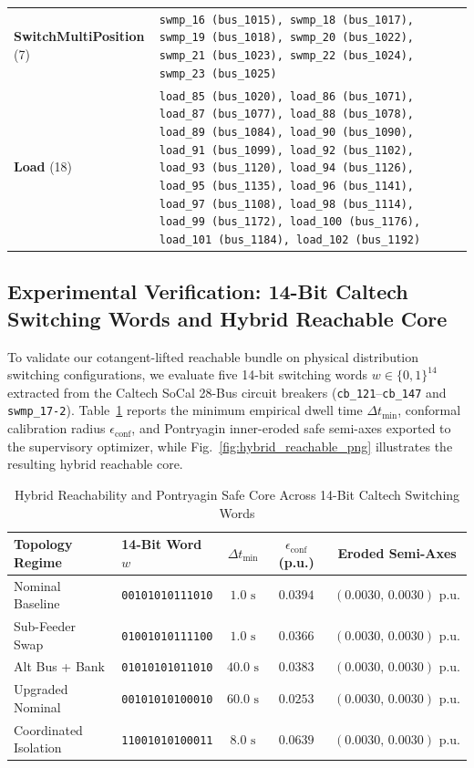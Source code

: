 \documentclass[journal]{IEEEtran}
\begin{document}
\begin{table}[!t]
\begin{tabularx}{\columnwidth}{@{}lX@{}}
\textbf{SwitchMultiPosition} (7) & \texttt{swmp\_16 (bus\_1015), swmp\_18 (bus\_1017), swmp\_19 (bus\_1018), swmp\_20 (bus\_1022), swmp\_21 (bus\_1023), swmp\_22 (bus\_1024), swmp\_23 (bus\_1025)} \\
\textbf{Load} (18) & \texttt{load\_85 (bus\_1020), load\_86 (bus\_1071), load\_87 (bus\_1077), load\_88 (bus\_1078), load\_89 (bus\_1084), load\_90 (bus\_1090), load\_91 (bus\_1099), load\_92 (bus\_1102), load\_93 (bus\_1120), load\_94 (bus\_1126), load\_95 (bus\_1135), load\_96 (bus\_1141), load\_97 (bus\_1108), load\_98 (bus\_1114), load\_99 (bus\_1172), load\_100 (bus\_1176), load\_101 (bus\_1184), load\_102 (bus\_1192)} \\
\bottomrule
\end{tabularx}
\end{table}
\subsection{Experimental Verification: 14-Bit Caltech Switching Words and Hybrid Reachable Core}
To validate our cotangent-lifted reachable bundle on physical distribution switching configurations, we evaluate five 14-bit switching words $w \in \{0, 1\}^{14}$ extracted from the Caltech SoCal 28-Bus circuit breakers (\texttt{cb\_121}--\texttt{cb\_147} and \texttt{swmp\_17-2}). Table~\ref{tab:caltech_14bit_words} reports the minimum empirical dwell time $\Delta t_{\min}$, conformal calibration radius $\epsilon_{\text{conf}}$, and Pontryagin inner-eroded safe semi-axes exported to the supervisory optimizer, while Fig.~\ref{fig:hybrid_reachable_png} illustrates the resulting hybrid reachable core.

\begin{table}[!t]
\centering
\caption{Hybrid Reachability and Pontryagin Safe Core Across 14-Bit Caltech Switching Words}
\label{tab:caltech_14bit_words}
\scriptsize
\setlength{\tabcolsep}{3.0pt}
\renewcommand{\arraystretch}{1.15}
\begin{tabular}{@{}llccc@{}}
\toprule
\textbf{Topology Regime} & \textbf{14-Bit Word $w$} & $\Delta t_{\min}$ & $\epsilon_{\text{conf}}$ (p.u.) & \textbf{Eroded Semi-Axes} \\
\midrule
Nominal Baseline & \texttt{00101010111010} & $1.0\text{ s}$ & $0.0394$ & $(0.0030,\, 0.0030)\text{ p.u.}$ \\
Sub-Feeder Swap & \texttt{01001010111100} & $1.0\text{ s}$ & $0.0366$ & $(0.0030,\, 0.0030)\text{ p.u.}$ \\
Alt Bus + Bank & \texttt{01010101011010} & $40.0\text{ s}$ & $0.0383$ & $(0.0030,\, 0.0030)\text{ p.u.}$ \\
Upgraded Nominal & \texttt{00101010100010} & $60.0\text{ s}$ & $0.0253$ & $(0.0030,\, 0.0030)\text{ p.u.}$ \\
Coordinated Isolation & \texttt{11001010100011} & $8.0\text{ s}$ & $0.0639$ & $(0.0030,\, 0.0030)\text{ p.u.}$ \\
\bottomrule
\end{tabular}
\end{table}
\end{document}
